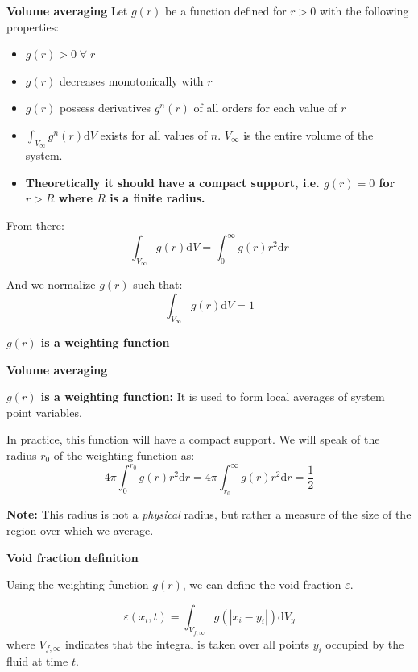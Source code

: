 \documentclass[c,11pt,xcolor=dvipsnames, aspectratio=169]{beamer}
\begin{document}
\begin{frame}{\textbf{Volume averaging}}
Let $g(r)$ be a function defined for $r>0$ with the following properties:
\begin{itemize}
	\item $g(r)>0\; \forall\; r$
	\item $g(r)$ decreases monotonically with $r$
	\item $g(r)$ possess derivatives $g^{n}(r)$ of all orders for each value of $r$
	\item $\int_{V_\infty} g^{n}(r) \mathrm{d}V$ exists for all values of $n$. $V_\infty$ is the entire volume of the system. 
	\item \textbf{Theoretically it should have a compact support, i.e. $g(r)=0$ for $r>R$ where $R$ is a finite radius.}
\end{itemize}

From there:
\[
\int_{V_\infty} g(r) \mathrm{d}V = \int_0^{\infty} g(r) r^2 \mathrm{d}r 
\]

And we normalize $g(r)$ such that:
\[
\int_{V_\infty} g(r) \mathrm{d}V = 1
\]

\textbf{$g(r)$ is a weighting function} 

\end{frame}


\begin{frame}{\textbf{Volume averaging}}

	{\begin{shaded}
\textbf{$g(r)$ is a weighting function:} It is used to form local averages of system point variables.
			\end{shaded}}

In practice, this function will have a compact support. We will speak of the radius $r_0$ of the weighting function as:
\[
4\pi \int_0^{r_0} g(r) r^2 \mathrm{d}r = 4\pi \int_{r_0}^{\infty} g(r) r^2 \mathrm{d}r = \frac{1}{2}
\]

\textbf{Note: } This radius is not a \textit{physical} radius, but rather a measure of the size of the region over which we average. 
	
\end{frame}



\begin{frame}{\textbf{Void fraction definition}}
	
	{\begin{shaded}
	Using the weighting function $g(r)$, we can define the void fraction $\varepsilon$.
	\end{shaded}}

	\[
\varepsilon(x_i,t) = \int_{V_{f,\infty}} g(|x_i-y_i|) \mathrm{d}V_y
	\]
where $V_{f,\infty}$ indicates that the integral is taken over all points $y_i$ occupied by the fluid at time $t$. 

\end{frame}
\end{document}
